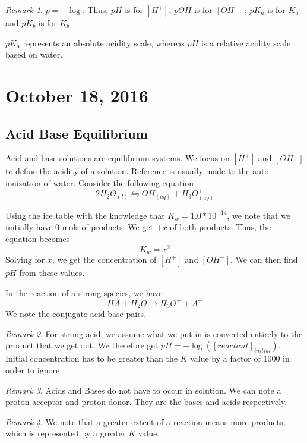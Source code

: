 \documentclass[11pt]{article}
\theoremstyle{plain} %
\theoremstyle{definition}
\theoremstyle{example}
\theoremstyle{remark}
\newtheorem*{remark}{Remark}
\begin{document}
\begin{remark}
$p = -\log$. Thus, $pH$ is for $[H^+]$, $pOH$ is for $[OH^-]$, $pK_a$ is for $K_a$ and $pK_b$ is for $K_b$
\end{remark}

$pK_a$ represents an absolute acidity scale, whereas $pH$ is a relative acidity scale based on water. 








\section{October 18, 2016}
\subsection{Acid Base Equilibrium}

Acid and base solutions are equilibrium systems. We focus on $[H^+]$ and $[OH^-]$ to define the acidity of a solution. Reference is usually made to the auto-ionization of water. 
Consider the following equation 
$$2H_2O_{(l)} \leftrightharpoons OH^-_{(aq)} + H_3O^+_{(aq)}$$

Using the ice table with the knowledge that $K_w = 1.0 * 10^{-14}$, we note that we initially have 0 mols of products. We get $+x$ of both products. Thus, the equation becomes $$K_w = x^2$$ Solving for $x$, we get the concentration of $[H^+]$ and $[OH^-]$. We can then find $pH$ from these values. 

In the reaction of a strong species, we have 
$$HA + H_2O \rightarrow H_3O^+ + A^-$$
We note the conjugate acid base pairs. 


\begin{remark}
For strong acid, we assume what we put in is converted entirely to the product that we get out. We therefore get $pH = -\log([reactant]_{initial})$. Initial concentration has to be greater than the $K$ value by a factor of 1000 in order to ignore
\end{remark}

\begin{remark}
Acids and Bases do not have to occur in solution. We can note a proton acceptor and proton donor. They are the bases and acids respectively. 
\end{remark} 

\begin{remark}
We note that a greater extent of a reaction means more products, which is represented by a greater $K$ value. 
\end{remark}
\end{document}

